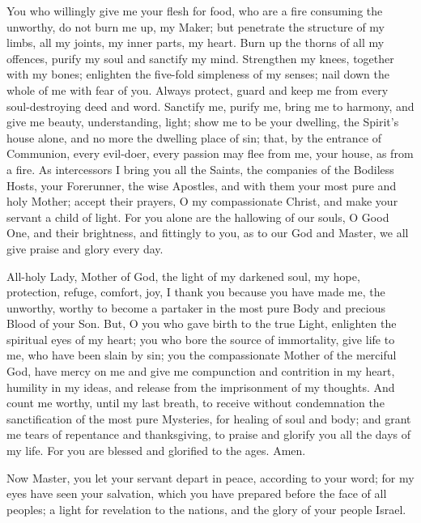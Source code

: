 
You who willingly give me your flesh for food, who are a fire consuming the unworthy, do not burn me up, my Maker; but penetrate the structure of my limbs, all my joints, my inner parts, my heart. Burn up the thorns of all my offences, purify my soul and sanctify my mind. Strengthen my knees, together with my bones; enlighten the five-fold simpleness of my senses; nail down the whole of me with fear of you. Always protect, guard and keep me from every soul-destroying deed and word. Sanctify me, purify me, bring me to harmony, and give me beauty, understanding, light; show me to be your dwelling, the Spirit's house alone, and no more the dwelling place of sin; that, by the entrance of Communion, every evil-doer, every passion may flee from me, your house, as from a fire. As intercessors I bring you all the Saints, the companies of the Bodiless Hosts, your Forerunner, the wise Apostles, and with them your most pure and holy Mother; accept their prayers, O my compassionate Christ, and make your servant a child of light. For you alone are the hallowing of our souls, O Good One, and their brightness, and fittingly to you, as to our God and Master, we all give praise and glory every day.

\attheprayersofallsaints


All-holy Lady, Mother of God, the light of my darkened soul, my hope, protection, refuge, comfort, joy, I thank you because you have made me, the unworthy, worthy to become a partaker in the most pure Body and precious Blood of your Son. But, O you who gave birth to the true Light, enlighten the spiritual eyes of my heart; you who bore the source of immortality, give life to me, who have been slain by sin; you the compassionate Mother of the merciful God, have mercy on me and give me compunction and contrition in my heart, humility in my ideas, and release from the imprisonment of my thoughts. And count me worthy, until my last breath, to receive without condemnation the sanctification of the most pure Mysteries, for healing of soul and body; and grant me tears of repentance and thanksgiving, to praise and glorify you all the days of my life. For you are blessed and glorified to the ages. Amen.



Now Master, you let your servant depart in peace, according to your word; for my eyes have seen your salvation, which you have prepared before the face of all peoples; a light for revelation to the nations, and the glory of your people Israel.

